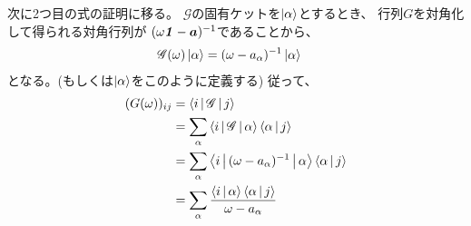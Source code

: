次に2つ目の式の証明に移る。
$\mathscr{G}$の固有ケットを$\ket{\alpha}$とするとき、
行列$G$を対角化して得られる対角行列が
$(\omega{\text{{\bf \textit{1}}}}-\bm{a})^{-1}$であることから、
\begin{align}
	\mathscr{G}(\omega) \ket{\alpha}
&=
	(\omega-a_{\alpha})^{-1} \ket{\alpha}
\end{align}
となる。(もしくは$\ket{\alpha}$をこのように定義する)
従って、
\begin{align}
	(G(\omega))_{ij}
&=
	\Braket{i|\mathscr{G}|j} \\
%
%
&=
	\sum_{\alpha}
		\Braket{i|\mathscr{G}|\alpha}
			\Braket{\alpha|j} \\
%
%
&=
	\sum_{\alpha}
		\Braket{i|(\omega-a_{\alpha})^{-1}|\alpha}
			\Braket{\alpha|j} \\
%
%
&=
	\sum_{\alpha}
		\frac{
			\Braket{i|\alpha} \Braket{\alpha|j}
		}{
			\omega-a_{\alpha}
		}
\end{align}



